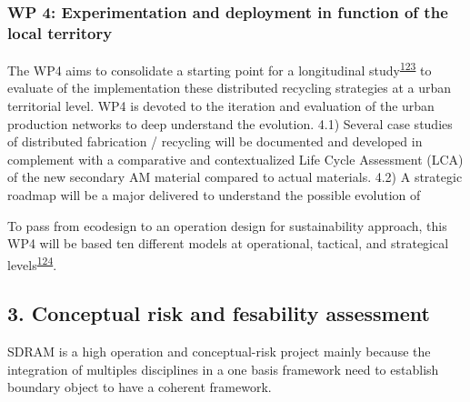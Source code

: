 \documentclass[
  11pt,
  a4paperpaper,
  onecolumn]{article}
\begin{document}
\hypertarget{wp-4-experimentation-and-deployment-in-function-of-the-local-territory}{%
\subsubsection{WP 4: Experimentation and deployment in function of the
local
territory}\label{wp-4-experimentation-and-deployment-in-function-of-the-local-territory}}

The WP4 aims to consolidate a starting point for a longitudinal
study\textsuperscript{\protect\hyperlink{ref-langley2013}{123}} to
evaluate of the implementation these distributed recycling strategies at
a urban territorial level. WP4 is devoted to the iteration and
evaluation of the urban production networks to deep understand the
evolution. 4.1) Several case studies of distributed fabrication /
recycling will be documented and developed in complement with a
comparative and contextualized Life Cycle Assessment (LCA) of the new
secondary AM material compared to actual materials. 4.2) A strategic
roadmap will be a major delivered to understand the possible evolution
of

To pass from ecodesign to an operation design for sustainability
approach, this WP4 will be based ten different models at operational,
tactical, and strategical
levels\textsuperscript{\protect\hyperlink{ref-SousaRocha2019}{124}}.

\hypertarget{conceptual-risk-and-fesability-assessment}{%
\subsection{3. Conceptual risk and fesability
assessment}\label{conceptual-risk-and-fesability-assessment}}

SDRAM is a high operation and conceptual-risk project mainly because the
integration of multiples disciplines in a one basis framework need to
establish boundary object to have a coherent framework.

\small
\end{document}
